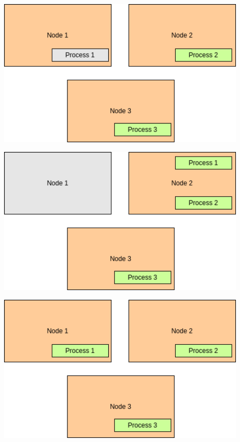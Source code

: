 \documentclass{beamer}
\begin{document}
\begin{frame}
    \includegraphics[width=0.9\textwidth, height=0.9\textheight]{img/scenario_2.drawio.png}
\end{frame}


\begin{frame}
    \includegraphics[width=0.9\textwidth, height=0.9\textheight]{img/scenario_3.drawio.png}
\end{frame}


\begin{frame}
    \includegraphics[width=0.9\textwidth, height=0.9\textheight]{img/scenario_4.drawio.png}
\end{frame}
\end{document}
